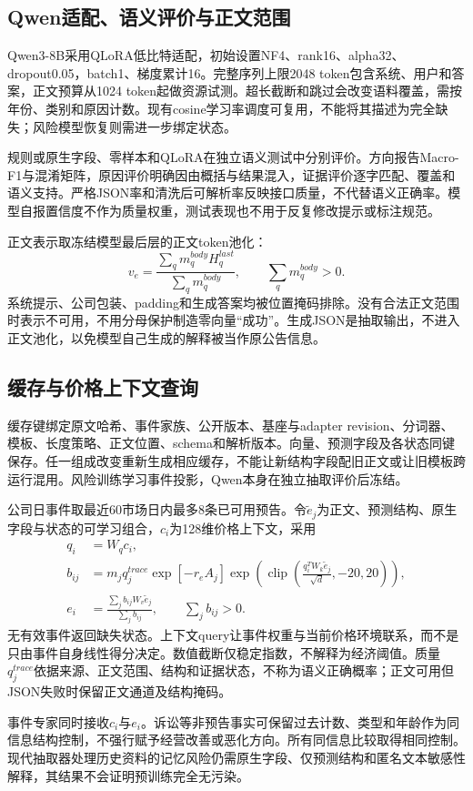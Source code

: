\subsection{Qwen适配、语义评价与正文范围}
Qwen3-8B采用QLoRA低比特适配，初始设置NF4、rank16、alpha32、dropout0.05，batch1、梯度累计16\cite{r21,r22,r23}。完整序列上限2048 token包含系统、用户和答案，正文预算从1024 token起做资源试测。超长截断和跳过会改变语料覆盖，需按年份、类别和原因计数。现有cosine学习率调度可复用，不能将其描述为完全缺失；风险模型恢复则需进一步绑定状态。

规则或原生字段、零样本和QLoRA在独立语义测试中分别评价。方向报告Macro-F1与混淆矩阵，原因评价明确因由概括与结果混入，证据评价逐字匹配、覆盖和语义支持。严格JSON率和清洗后可解析率反映接口质量，不代替语义正确率。模型自报置信度不作为质量权重，测试表现也不用于反复修改提示或标注规范。

正文表示取冻结模型最后层的正文token池化：
\begin{equation}
 v_e=\frac{\sum_q m_q^{body}H_q^{last}}{\sum_q m_q^{body}},\qquad\sum_qm_q^{body}>0.
\end{equation}
系统提示、公司包装、padding和生成答案均被位置掩码排除。没有合法正文范围时表示不可用，不用分母保护制造零向量“成功”。生成JSON是抽取输出，不进入正文池化，以免模型自己生成的解释被当作原公告信息。


\subsection{缓存与价格上下文查询}
缓存键绑定原文哈希、事件家族、公开版本、基座与adapter revision、分词器、模板、长度策略、正文位置、schema和解析版本。向量、预测字段及各状态同键保存。任一组成改变重新生成相应缓存，不能让新结构字段配旧正文或让旧模板跨运行混用。风险训练学习事件投影，Qwen本身在独立抽取评价后冻结。


公司日事件取最近60市场日内最多8条已可用预告。令$\widetilde e_j$为正文、预测结构、原生字段与状态的可学习组合，$c_i$为128维价格上下文，采用
\begin{align}
 q_i&=W_qc_i,\\
 b_{ij}&=m_jq_j^{trace}\exp[-r_eA_j]
 \exp\!\left(\operatorname{clip}\!\left(\frac{q_i^TW_k\widetilde e_j}{\sqrt d},-20,20\right)\right),\\
 e_i&=\frac{\sum_j b_{ij}W_v\widetilde e_j}{\sum_j b_{ij}},\qquad\sum_jb_{ij}>0.
\end{align}
无有效事件返回缺失状态。上下文query让事件权重与当前价格环境联系，而不是只由事件自身线性得分决定。数值截断仅稳定指数，不解释为经济阈值。质量$q_j^{trace}$依据来源、正文范围、结构和证据状态，不称为语义正确概率；正文可用但JSON失败时保留正文通道及结构掩码。

事件专家同时接收$c_i$与$e_i$。诉讼等非预告事实可保留过去计数、类型和年龄作为同信息结构控制，不强行赋予经营改善或恶化方向。所有同信息比较取得相同控制。现代抽取器处理历史资料的记忆风险仍需原生字段、仅预测结构和匿名文本敏感性解释，其结果不会证明预训练完全无污染。

